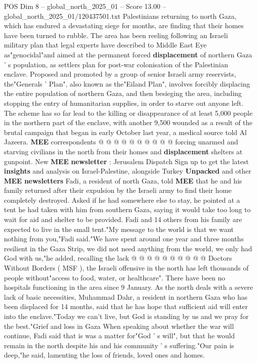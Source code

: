 \begin{textsample}{POS Dim 8 – global\_north\_2025\_01 – Score 13.00 – global\_north\_2025\_01/120437501.txt}  \label{ex:f8_pos_106}
Palestinians returning to north Gaza, which has endured a devastating siege for months, are finding that their homes have been turned to rubble.
The area has been reeling following an Israeli military plan that legal experts have described to Middle East Eye as"genocidal"and aimed at the permanent forced \textbf{displacement} of northern Gaza ' s population, as settlers plan for post-war colonisation of the Palestinian enclave.
Proposed and promoted by a group of senior Israeli army reservists, the"Generals ' Plan", also known as the"Eiland Plan", involves forcibly displacing the entire population of northern Gaza, and then besieging the area, including stopping the entry of humanitarian supplies, in order to starve out anyone left.
The scheme has so far lead to the killing or disappearance of at least 5,000 people in the northern part of the enclave, with another 9,500 wounded as a result of the brutal campaign that began in early October last year, a medical source told Al Jazeera. \textbf{MEE} correspondents @ @ @ @ @ @ @ @ @ @ forcing unarmed and starving civilians in the north from their homes and \textbf{displacement} shelters at gunpoint.
New \textbf{MEE} \textbf{newsletter} : Jerusalem Dispatch Sign up to get the latest \textbf{insights} and analysis on Israel-Palestine, alongside Turkey \textbf{Unpacked} and other \textbf{MEE} \textbf{newsletters} Fadi, a resident of north Gaza, told \textbf{MEE} that he and his family returned after their expulsion by the Israeli army to find their home completely destroyed.
Asked if he had somewhere else to stay, he pointed at a tent he had taken with him from southern Gaza, saying it would take too long to wait for aid and shelter to be provided.
Fadi and 14 others from his family are expected to live in the small tent."My message to the world is that we want nothing from you,"Fadi said."We have spent around one year and three months resilient in the Gaza Strip, we did not need anything from the world, we only had God with us,"he added, recalling the lack @ @ @ @ @ @ @ @ @ @ Doctors Without Borders ( MSF ), the Israeli offensive in the north has left thousands of people without"access to food, water, or healthcare".
There have been no hospitals functioning in the area since 9 January.
As the north deals with a severe lack of basic necessities, Muhammad Dahr, a resident in northern Gaza who has been displaced for 14 months, said that he has hope that sufficient aid will enter into the enclave."Today we can't live, but God is standing by us and we pray for the best."Grief and loss in Gaza When speaking about whether the war will continue, Fadi said that is was a matter for"God ' s will", but that he would remain in the north despite his and his community ' s suffering."Our pain is deep,"he said, lamenting the loss of friends, loved ones and homes.

\end{textsample}
